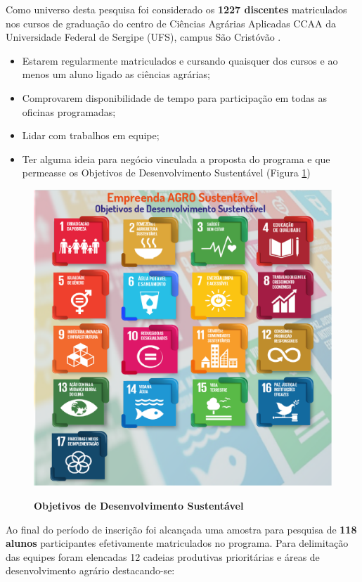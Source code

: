 Como universo desta pesquisa foi considerado os  \textbf{1227 discentes} matriculados nos cursos de graduação do centro de Ciências Agrárias Aplicadas CCAA da Universidade Federal de Sergipe (UFS), campus São Cristóvão \cite{andrade_ufs_2019}. 
	
\begin{itemize}
\item{Estarem regularmente matriculados e cursando quaisquer dos cursos e ao menos um aluno ligado as ciências agrárias;}
\item{Comprovarem disponibilidade de tempo para participação em todas as oficinas programadas;}
\item{Lidar com trabalhos em equipe;}
\item{Ter alguma ideia para negócio vinculada a proposta do programa e que permeasse os Objetivos de Desenvolvimento Sustentável (Figura \ref{figura_ods})}
\end{itemize}


\begin{figure}[!h]
\centering
\caption{\textbf{Objetivos de Desenvolvimento Sustentável}}
\includegraphics[scale=0.2]{Imagens/ODS_GERAL.png}
\label{figura_ods}
\end{figure}

Ao final do período de inscrição foi alcançada uma amostra para pesquisa de \textbf{118 alunos} participantes efetivamente matriculados no programa. Para delimitação das equipes foram elencadas 12 cadeias produtivas  prioritárias e áreas de desenvolvimento agrário destacando-se:


